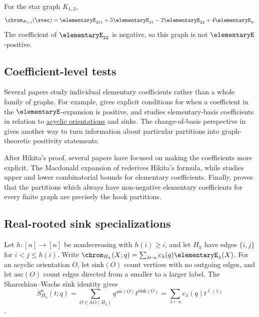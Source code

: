 \begin{example}\label{chromaticEStarObstruction}
For the star graph $K_{1,3}$,
\[
\chrom_{K_{1,3}}(\xvec)
= \elementaryE_{211} + 5\elementaryE_{31}
-2\elementaryE_{22} + 4\elementaryE_4.
\]
The coefficient of $\elementaryE_{22}$ is negative, so this graph is not
$\elementaryE$-positive.
\end{example}


\subsection[chromaticEExpansionCoefficientTests]{Coefficient-level tests}

Several papers study individual elementary coefficients rather than a whole
family of graphs.  For example, \cite{ChoHongLee2020x} gives explicit
conditions for when a coefficient in the $\elementaryE$-expansion is positive,
and \cite{CrewZhang2022x} studies elementary-basis coefficients in relation to
\hyperref[acyclicOrientation]{acyclic orientations} and sinks.  The
change-of-basis perspective in
\cite{SaganTom2026} gives another way to turn information about particular
partitions into graph-theoretic positivity statements.

After Hikita's proof, several papers have focused on making the coefficients
more explicit.  The Macdonald expansion of
\cite{GriffinMellitRomeroWeiglWen2025x} rederives Hikita's formula, while
\cite{Siegl2025x} studies upper and lower combinatorial bounds for elementary
coefficients.  Finally, \cite{Kravitz2026x} proves that the partitions which
always have non-negative elementary coefficients for every finite graph are
precisely the hook partitions.

\subsection[chromaticSinkRealRooted]{Real-rooted sink specializations}

Let $h:[n]\to[n]$ be nondecreasing with $h(i)\geq i$, and let $H_h$
have edges $\{i,j\}$ for $i<j\leq h(i)$. Write
$\chrom_{H_h}(X;q)=\sum_{\lambda\vdash n}c_\lambda(q)\elementaryE_\lambda(X)$.
For an acyclic orientation $O$, let $\mathrm{sink}(O)$ count vertices with
no outgoing edges, and let $\mathrm{asc}(O)$ count edges directed from a
smaller to a larger label. The Shareshian--Wachs sink identity gives
\[
 S^a_{H_h}(t;q)
 =\sum_{O\in\mathrm{AO}(H_h)}q^{\mathrm{asc}(O)}t^{\mathrm{sink}(O)}
 =\sum_{\lambda\vdash n}c_\lambda(q)t^{\ell(\lambda)}
\]
\cite[Thm.~5.3]{ShareshianWachs2016}.

